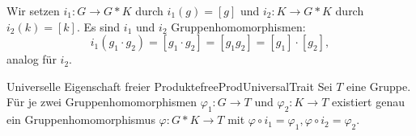 \documentclass[language=ngerman]{TemplateLecture} %
\begin{document}
Wir setzen $i_1: G \to G * K$ durch $i_1(g) = [g]$ und $i_2: K \to G * K$ durch $i_2(k) = [k]$. Es sind $i_1$ und $i_2$ Gruppenhomomorphismen:
\begin{equation*}
    i_1(g_1 \cdot g_2) = [g_1 \cdot g_2] = [g_1 g_2] = [g_1] \cdot [g_2],
\end{equation*}
analog für $i_2$.

\begin{lem}{Universelle Eigenschaft freier Produkte}{freeProdUniversalTrait}
    Sei $T$ eine Gruppe. Für je zwei Gruppenhomomorphismen $\varphi_1: G \to T$ und $\varphi_2: K \to T$ existiert genau ein Gruppenhomomorphismus $\varphi: G * K \to T$ mit $\varphi \circ i_1 = \varphi_1, \varphi \circ i_2 = \varphi_2$.
\end{lem}
\end{document}
